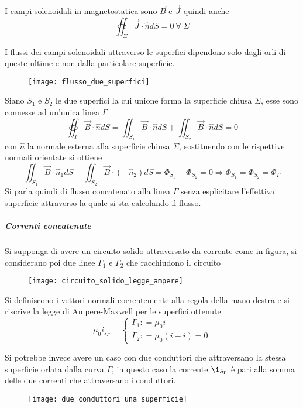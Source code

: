 I campi solenoidali in magnetostatica sono $\vec{B}$ e $\vec{J}$ quindi anche
$$
\oiint_\Sigma \vec{J}\cdot\hat{n} dS = 0\ \forall\ \Sigma
$$

I flussi dei campi solenoidali attraverso le superfici dipendono solo dagli orli di
queste ultime e non dalla particolare superficie.
\begin{figure}[H]
\centering
\texttt{[image: flusso\_due\_superfici]}
\end{figure}
Siano $S_1$ e $S_2$ le due superfici la cui unione forma la superficie chiusa $\Sigma$, esse
sono connesse ad un'unica linea $\Gamma$
$$
\oiint_\Gamma \vec{B}\cdot\hat{n}dS = \iint_{S_1} \vec{B}\cdot\hat{n}dS + \iint_{S_2} \vec{B}\cdot\hat{n}dS = 0
$$
con $\hat{n}$ la normale esterna alla superficie chiusa $\Sigma$, sostituendo con le 
rispettive normali orientate si ottiene
$$
\iint_{S_1} \vec{B}\cdot\hat{n}_1dS + \iint_{S_2} \vec{B}\cdot\left(-\hat{n}_2\right)dS = 
\Phi_{S_1} - \Phi_{S_2} = 0 \Rightarrow \Phi_{S_1} = \Phi_{S_2} = \Phi_\Gamma
$$
Si parla quindi di flusso concatenato alla linea $\Gamma$ senza esplicitare l'effettiva
superficie attraverso la quale si sta calcolando il flusso.

\subparagraph{Correnti concatenate}
Si supponga di avere un circuito solido attraversato da corrente come in figura,
si considerano poi due linee $\Gamma_1$ e $\Gamma_2$ che racchiudono il circuito
\begin{figure}[H]
\centering
\texttt{[image: circuito\_solido\_legge\_ampere]}
\end{figure}

Si definiscono i vettori normali coerentemente alla regola della mano destra
e si riscrive la legge di Ampere-Maxwell per le superfici ottenute
$$
\mu_0 i_{s_\Gamma} =
\begin{cases}
\Gamma_1 : = \mu_0 i\\
\Gamma_2 : = \mu_0(i-i) = 0
\end{cases}
$$

Si potrebbe invece avere un caso con due conduttori che attraversano la stessa superficie
orlata dalla curva $\Gamma$, in questo caso la corrente $\i_{S_\Gamma}$ è pari alla
somma delle due correnti che attraversano i conduttori.
\begin{figure}[H]
\centering
\texttt{[image: due\_conduttori\_una\_superficie]}
\end{figure}
\newpage
